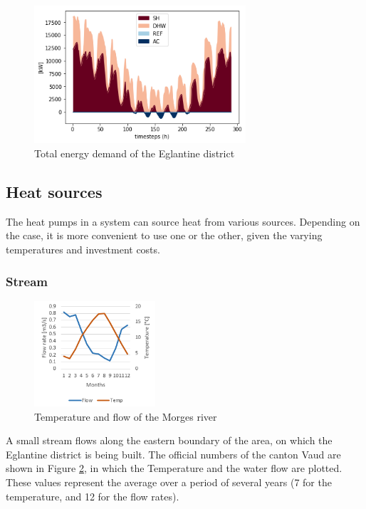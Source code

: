 \documentclass{article}
\begin{document}
\begin{figure}[h!]
	\centering
	\includegraphics[width=0.7\textwidth]{energy_demand.png}
	\caption{Total energy demand of the Eglantine district}
	\label{fig:energyDemand}
\end{figure}


\subsection{Heat sources}
The heat pumps in a system can source heat from various sources. Depending on the case, it is more convenient to use one or the other, given the varying temperatures and investment costs.

\subsubsection{Stream}
\begin{figure} 
	\vspace{-20pt}
	\centering
	\includegraphics[width=0.4\textwidth]{river.png}
	\caption{Temperature and flow of the Morges river}
	\label{fig:river}
	\vspace{-10pt}
\end{figure}

A small stream flows along the eastern boundary of the area, on which the Eglantine district is being built. The official numbers of the canton Vaud \cite{veillehydro-meteorologiqueducantondevaudMorgesRiviereDebit} are shown in Figure \ref{fig:river}, in which the Temperature and the water flow are plotted. These values represent the average over a period of several years (7 for the temperature, and 12 for the flow rates). 
\end{document}
